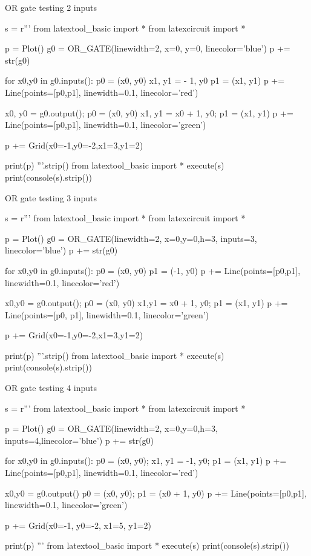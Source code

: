 \newpage
OR gate testing 2 inputs
\begin{python}
s = r'''
from latextool_basic import *
from latexcircuit import *

p = Plot()
g0 = OR_GATE(linewidth=2, x=0, y=0, linecolor='blue')
p += str(g0)

for x0,y0 in g0.inputs():
    p0 = (x0, y0)
    x1, y1 = - 1, y0
    p1 = (x1, y1)
    p += Line(points=[p0,p1], linewidth=0.1, linecolor='red')

x0, y0 = g0.output(); p0 = (x0, y0)
x1, y1 = x0 + 1, y0; p1 = (x1, y1)
p += Line(points=[p0,p1], linewidth=0.1, linecolor='green')

p += Grid(x0=-1,y0=-2,x1=3,y1=2)

print(p)
'''.strip()
from latextool_basic import *
execute(s)
print(console(s).strip())
\end{python}



\newpage
OR gate testing 3 inputs
\begin{python}
s = r'''
from latextool_basic import *
from latexcircuit import *

p = Plot()
g0 = OR_GATE(linewidth=2, x=0,y=0,h=3, inputs=3, linecolor='blue')
p += str(g0)

for x0,y0 in g0.inputs():
    p0 = (x0, y0)
    p1 = (-1, y0)
    p += Line(points=[p0,p1], linewidth=0.1, linecolor='red')

x0,y0 = g0.output(); p0 = (x0, y0)
x1,y1 = x0 + 1, y0; p1 = (x1, y1)
p += Line(points=[p0, p1], linewidth=0.1, linecolor='green')

p += Grid(x0=-1,y0=-2,x1=3,y1=2)

print(p)
'''.strip()
from latextool_basic import *
execute(s)
print(console(s).strip())
\end{python}


\newpage
OR gate testing 4 inputs
\begin{python}
s = r'''
from latextool_basic import *
from latexcircuit import *

p = Plot()
g0 = OR_GATE(linewidth=2, x=0,y=0,h=3, inputs=4,linecolor='blue')
p += str(g0)

for x0,y0 in g0.inputs():
    p0 = (x0, y0); x1, y1 = -1, y0; p1 = (x1, y1)
    p += Line(points=[p0,p1], linewidth=0.1, linecolor='red')

x0,y0 = g0.output()
p0 = (x0, y0); p1 = (x0 + 1, y0)
p += Line(points=[p0,p1], linewidth=0.1, linecolor='green')

p += Grid(x0=-1, y0=-2, x1=5, y1=2)

print(p)
'''
from latextool_basic import *
execute(s)
print(console(s).strip())
\end{python}


